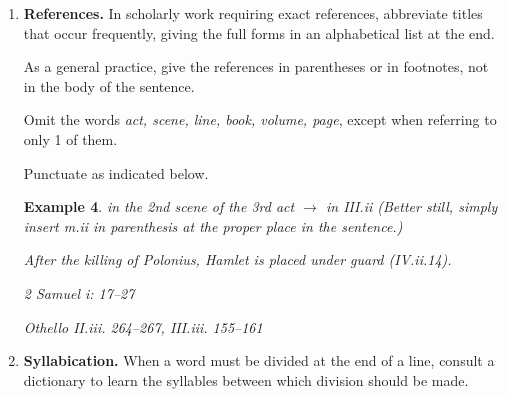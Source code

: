 \documentclass{book}
\numberwithin{equation}{section}
\newtheorem{example}{Example}[chapter]
\begin{document}
\begin{enumerate}
    Quotation marks should not be used unless they appear in the original, as in dialogue.
    \begin{example}
        Wordworth's enthusiasm for the French Revolution was at 1st unbounded:
        
        Bliss was it in that dawn to be alive,
        
        But to be young was very heaven!
    \end{example}
    Quotations introduced by \textit{that} are indirect discourse and not enclosed in quotation marks.
    \begin{example}
        Keats declares that beauty is truth, truth beauty.
        
        Dickinson states that a coffin is a small domain.
    \end{example}
    Proverbial expressions and familiar phrases of literary origin require no quotation marks.
    \begin{example}
        These are the times that try men's souls.
        
        He lives far from the madding crowd.
    \end{example}
    \item \textbf{References.} In scholarly work requiring exact references, abbreviate titles that occur frequently, giving the full forms in an alphabetical list at the end.
    
    As a general practice, give the references in parentheses or in footnotes, not in the body of the sentence.
    
    Omit the words \textit{act, scene, line, book, volume, page}, except when referring to only 1 of them.
    
    Punctuate as indicated below.
    \begin{example}
        in the 2nd scene of the 3rd act $\to$ in III.ii (Better still, simply insert m.ii in parenthesis at the proper place in the sentence.)
        
        After the killing of Polonius, Hamlet is placed under guard (IV.ii.14).
        
        2 Samuel i: 17--27
        
        Othello II.iii. 264--267, III.iii. 155--161
    \end{example}
    \item \textbf{Syllabication.} When a word must be divided at the end of a line, consult a dictionary to learn the syllables between which division should be made.
    

\end{enumerate}
\end{document}
